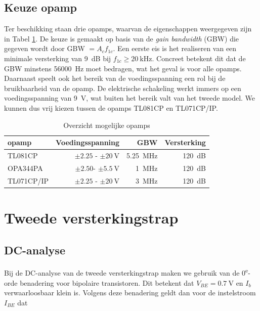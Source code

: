 \documentclass{report}
\begin{document}
\subsection{Keuze opamp}

Ter beschikking staan drie opamps, waarvan de eigenschappen weergegeven zijn in Tabel \ref{tab:opamps}. De keuze is gemaakt op basis van de \textit{gain bandwidth} (GBW) die gegeven wordt door GBW $ = A_cf_{1c}$. Een eerste eis is het realiseren van een minimale versterking van \SI{9}{\deci\bel} bij $f_{1c} \geq \SI{20}{\kilo\hertz}$. Concreet betekent dit dat de GBW minstens \SI{56000}{\hertz} moet bedragen, wat het geval is voor alle opamps. Daarnaast speelt ook het bereik van de voedingsspanning een rol bij de bruikbaarheid van de opamp. De elektrische schakeling werkt immers op een voedingsspanning van \SI{9}{\volt}, wat buiten het bereik valt van het tweede model. We kunnen dus vrij kiezen tussen de opamps TL081CP en TL071CP/IP.

\begin{table}[h]
    \centering

    \begin{tabular}{lrrr}
    \toprule
    opamp & Voedingsspanning & GBW & Versterking \\
    \midrule
    TL081CP & $\pm 2.25$ - $ \pm \SI{20}{\volt}$ & \SI{5.25}{\mega\hertz} & \SI{120}{\deci\bel} \\
    OPA344PA & $\pm 2.50$- $\pm  \SI{5.5}{\volt}$ & \SI{1}{\mega\hertz} & \SI{120}{\deci\bel}\\
    TL071CP/IP & $\pm 2.25 $ - $ \pm \SI{20}{\volt}$ & \SI{3}{\mega\hertz} & \SI{120}{\deci\bel}\\
    \bottomrule
    \end{tabular}
    \caption{Overzicht mogelijke opamps}
    \label{tab:opamps}
\end{table}

\section{Tweede versterkingstrap}\subsection{DC-analyse}\label{DC-analyseTekst}
Bij de DC-analyse van de tweede versterkingstrap maken we gebruik van de  0\textsuperscript{e}-orde benadering voor bipolaire transistoren. Dit betekent dat $V_{BE} = \SI{0.7}{\volt}$ en $I_b$ verwaarloosbaar klein is. Volgens deze benadering geldt dan voor de instelstroom $I_{BE}$ dat
\end{document}
